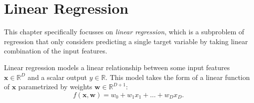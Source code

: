 

\section{Linear Regression}
This chapter specifically focusses on \emph{linear regression}, which is a subproblem of regression that only considers predicting a single target variable by taking linear combination of the input features.

\begin{definition}
    Linear regression models a linear relationship between some input features $\bm x \in \mathbb R^D$ and a scalar output $y \in \mathbb R$. This model takes the form of a linear function of $\bm x$ parametrized by weights $\bm w \in \mathbb R^{D + 1}$:
    \begin{equation}
        \label{eq:linreg}
        f(\bm x, \bm w) = w_0 + w_1 x_1 + \ldots + w_D x_D.
    \end{equation}
\end{definition}

